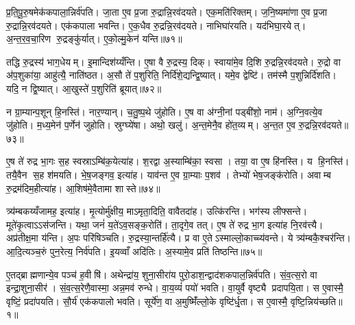 प्र॒ति॒पू॒रु॒षमेक॑कपाला॒न्निर्व॑पति। जा॒ता ए॒व प्र॒जा रु॒द्रान्नि॒रव॑दयते। एक॒मति॑रिक्तम्। ज॒नि॒ष्यमा॑णा ए॒व प्र॒जा रु॒द्रान्नि॒रव॑दयते। एक॑कपाला भवन्ति। ए॒क॒धैव रु॒द्रन्नि॒रव॑दयते। नाभिघा॑रयति। यद॑भिघा॒रयेत्। अ॒न्त॒र॒व॒चा॒रिण रु॒द्रङ्कु॑र्यात्। ए॒को॒ल्मु॒केन॑ यन्ति॥७१॥

तद्धि रु॒द्रस्य॑ भाग॒धेयम्। इ॒मान्दिश॑य्यँन्ति। ए॒षा वै रु॒द्रस्य॒ दिक्। स्वाया॑मे॒व दि॒शि रु॒द्रन्नि॒रव॑दयते। रु॒द्रो वा अ॑प॒शुका॑या॒ आहु॑त्यै॒ नाति॑ष्ठत। अ॒सौ ते॑ प॒शुरिति॒ निर्दि॑शे॒द्यन्द्वि॒ष्यात्। यमे॒व द्वेष्टि॑। तम॑स्मै प॒शुन्निर्दि॑शति। यदि॒ न द्वि॒ष्यात्। आ॒खुस्ते॑ प॒शुरिति॑ ब्रूयात्॥७२॥

न ग्रा॒म्यान्प॒शून् हि॒नस्ति॑। नार॒ण्यान्। च॒तु॒ष्प॒थे जु॑होति। ए॒ष वा अ॑ग्नी॒नां पड्बी॑शो॒ नाम॑। अ॒ग्नि॒वत्ये॒व जु॑होति। म॒ध्य॒मेन॑ प॒र्णेन॑ जुहोति। स्रुग्घ्ये॑षा। अथो॒ खलु॑। अ॒न्त॒मेनै॒व हो॑त॒व्यम्। अ॒न्त॒त ए॒व रु॒द्रन्नि॒रव॑दयते॥७३॥

ए॒ष ते॑ रुद्र भा॒गः स॒ह स्वस्राऽम्बि॑क॒येत्या॑ह। श॒रद्वा अ॒स्याम्बि॑का॒ स्वसा। तया॒ वा ए॒ष हि॑नस्ति। य हि॒नस्ति॑। तयै॒वैन स॒ह श॑मयति। भे॒ष॒जङ्गव॒ इत्या॑ह। याव॑न्त ए॒व ग्रा॒म्याः प॒शव॑। तेभ्यो॑ भेष॒जङ्क॑रोति। अवाम्ब रु॒द्रम॑दिम॒हीत्या॑ह। आ॒शिष॑मे॒वैतामा शास्ते॥७४॥

त्र्य॑म्बकय्यँजामह॒ इत्या॑ह। मृ॒त्योर्मु॑क्षीय॒ माऽमृता॒दिति॒ वावैतदा॑ह। उत्कि॑रन्ति। भग॑स्य लीफ्सन्ते। मूते॑कृ॒त्वाऽऽस॑जन्ति। यथा॒ जनं॑ य॒ते॑ऽव॒सङ्क॒रोति॑। ता॒दृगे॒व तत्। ए॒ष ते॑ रुद्र भा॒ग इत्या॑ह नि॒रव॑त्त्यै। अप्र॑तीक्ष॒मा य॑न्ति। अ॒पः परि॑षिञ्चति। रु॒द्रस्या॒न्तर्\mbox{}हि॑त्यै। प्र वा ए॒तेऽस्माल्लो॒काच्च्य॑वन्ते। ये त्र्य॑म्बकै॒श्चर॑न्ति। आ॒दि॒त्यञ्च॒रुं पुन॒रेत्य॒ निर्व॑पति। इ॒यव्वाँ अदि॑तिः। अ॒स्यामे॒व प्रति॑ तिष्ठन्ति॥७५॥



\clearpage
{}
\setcounter{anuvakam}{0}
ए॒तद्ब्राह्मणान्ये॒व पञ्च॑ ह॒वीषि॑। अथेन्द्रा॑य॒ शुना॒सीरा॑य पुरो॒डाश॒न्द्वाद॑शकपाल॒न्निर्व॑पति। सं॒व॒त्स॒रो वा इन्द्रा॒शुना॒सीर॑। सं॒व॒त्स॒रेणै॒वास्मा॒ अन्न॒मव॑ रुन्धे। वा॒य॒व्यं॑ पयो॑ भवति। वा॒युर्वै वृष्ट्यै प्रदापयि॒ता। स ए॒वास्मै॒ वृष्टिं॒ प्रदा॑पयति। सौ॒र्य॑ एक॑कपालो भवति। सूर्ये॑ण॒ वा अ॒मुष्मिँ॑ल्लो॒के वृष्टि॑र्धृ॒ता। स ए॒वास्मै॒ वृष्टि॒न्निय॑च्छति॥१॥

